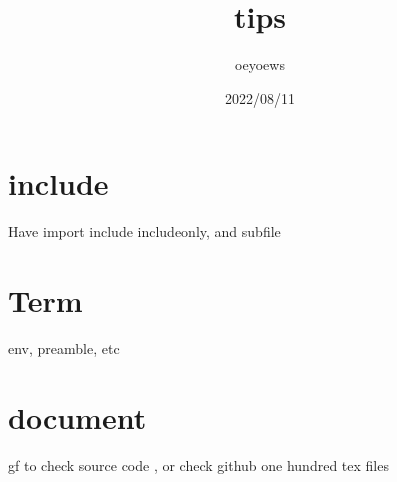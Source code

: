 \documentclass[UTF8]{ctexart}
\title{tips}
\author{oeyoews}
\date{2022/08/11}
\begin{document}
\maketitle


\section{include}%
\label{sec:include}

Have import include includeonly, and subfile

\section{Term}%
\label{sec:term}

env, preamble, etc

\section{document}%
\label{sec:document}

gf to check source code , or check github one hundred tex files
\end{document}
